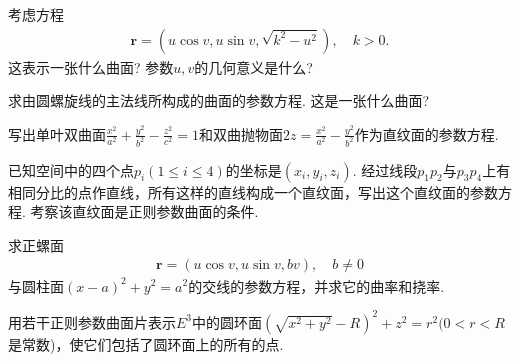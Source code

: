 \documentclass[../../main.tex]{subfiles}%
\begin{document}
\begin{example}
考虑方程
\begin{align*}
\bm{r} = (u \cos v, u \sin v, \sqrt{k^2 - u^2}), \quad k > 0.
\end{align*}
这表示一张什么曲面? 参数$u,v$的几何意义是什么?
\end{example}
\begin{solution}


\end{solution}

\begin{example}
求由圆螺旋线的主法线所构成的曲面的参数方程. 这是一张什么曲面?
\end{example}
\begin{solution}


\end{solution}

\begin{example}
写出单叶双曲面$\frac{x^2}{a^2} + \frac{y^2}{b^2} - \frac{z^2}{c^2} = 1$和双曲抛物面$2z = \frac{x^2}{a^2} - \frac{y^2}{b^2}$作为直纹面的参数方程.
\end{example}
\begin{solution}


\end{solution}

\begin{example}
已知空间中的四个点$p_i(1 \leqslant i \leqslant 4)$的坐标是$(x_i,y_i,z_i)$. 经过线段$p_1p_2$与$p_3p_4$上有相同分比的点作直线，所有这样的直线构成一个直纹面，写出这个直纹面的参数方程. 考察该直纹面是正则参数曲面的条件.
\end{example}
\begin{solution}


\end{solution}

\begin{example}
求正螺面
\begin{align*}
\bm{r} = (u \cos v, u \sin v, bv), \quad b \neq 0
\end{align*}
与圆柱面$(x - a)^2 + y^2 = a^2$的交线的参数方程，并求它的曲率和挠率.
\end{example}
\begin{solution}


\end{solution}

\begin{example}
用若干正则参数曲面片表示$E^3$中的圆环面$(\sqrt{x^2 + y^2} - R)^2 + z^2 = r^2(0 < r < R$是常数)，使它们包括了圆环面上的所有的点.
\end{example}
\begin{solution}


\end{solution}
\end{document}
